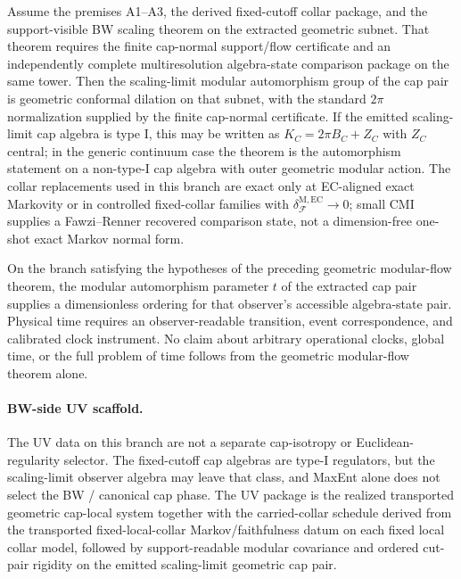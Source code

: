 \begin{theorem}
Assume the premises A1--A3, the derived fixed-cutoff collar package, and the support-visible BW
scaling theorem on the extracted geometric subnet. That theorem requires the finite cap-normal
support/flow certificate and an independently complete multiresolution algebra-state comparison
package on the same tower. Then the scaling-limit modular
automorphism group of the cap pair is geometric conformal dilation on that
subnet, with the standard \(2\pi\) normalization supplied by the finite cap-normal certificate.
If the emitted scaling-limit cap algebra is type I, this may be written as
\(K_C=2\pi B_C+Z_C\) with \(Z_C\) central; in the generic continuum case the theorem is the
automorphism statement on a non-type-I cap algebra with outer geometric modular action. The collar
replacements used in this branch are exact only at EC-aligned exact Markovity
or in controlled fixed-collar families with
\(\delta^{\mathrm{M,EC}}_{\mathcal F}\to0\); small CMI supplies a
Fawzi--Renner recovered comparison state, not a dimension-free one-shot exact Markov normal form.
\end{theorem}

\begin{definition}
On the branch satisfying the hypotheses of the preceding geometric modular-flow theorem, the
modular automorphism parameter \(t\) of the extracted cap pair supplies a dimensionless ordering for
that observer's accessible algebra-state pair. Physical time requires an observer-readable
transition, event correspondence, and calibrated clock instrument. No claim about arbitrary
operational clocks, global time, or the full problem of time follows from the geometric modular-flow
theorem alone.
\end{definition}

\paragraph{BW-side UV scaffold.}
The UV data on this branch are not a separate cap-isotropy or Euclidean-regularity
selector. The fixed-cutoff cap algebras are type-I regulators, but the scaling-limit observer
algebra may leave that class, and MaxEnt alone does not select the BW / canonical cap phase. The
UV package is the realized transported geometric cap-local system together with the
carried-collar schedule derived from the transported fixed-local-collar Markov/faithfulness datum
on each fixed local collar model, followed by support-readable modular covariance and ordered
cut-pair rigidity on the emitted scaling-limit geometric cap pair.

